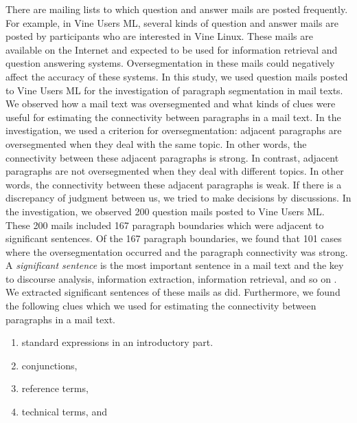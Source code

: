 \documentclass[english]{jnlp_1.4}
\begin{document}
There are mailing lists to which question and answer mails are posted frequently. 
For example, in Vine Users ML, 
several kinds of question and answer mails are posted by participants 
who are interested in Vine Linux.
These mails are available on the Internet and 
expected to be used for information retrieval and question answering systems.
Oversegmentation in these mails could negatively affect the accuracy of these systems.
In this study, 
we used question mails posted to Vine Users ML
for the investigation of paragraph segmentation in mail texts.
We observed how a mail text was oversegmented and 
what kinds of clues were useful 
for estimating the connectivity between paragraphs in a mail text.
In the investigation, 
we used a criterion for oversegmentation:
adjacent paragraphs are oversegmented
when they deal with the same topic. 
In other words, 
the connectivity between these adjacent paragraphs is strong.
In contrast, 
adjacent paragraphs are not oversegmented
when they deal with different topics.
In other words, 
the connectivity between these adjacent paragraphs is weak.
If there is a discrepancy of judgment between us, 
we tried to make decisions by discussions.
In the investigation, 
we observed 200 question mails posted to Vine Users ML.
These 200 mails included 167 paragraph boundaries
which were adjacent to significant sentences.
Of the 167 paragraph boundaries, 
we found that 101 cases 
where the oversegmentation occurred and 
the paragraph connectivity was strong. 
A \textit{significant sentence} is the most important sentence in a mail text
and the key to 
discourse analysis, information extraction, information retrieval, and so on 
\cite{thesis:watanabe2008}.
We extracted significant sentences of these mails 
as \cite{thesis:watanabe2008} did.
Furthermore, 
we found 
the following clues 
which we used for estimating the connectivity between paragraphs in a mail text.
\begin{enumerate}
 \item standard expressions in an introductory part.   
       
 \item conjunctions,                    
 \item reference terms,                 
 \item technical terms, and             
\end{enumerate}
\end{document}
